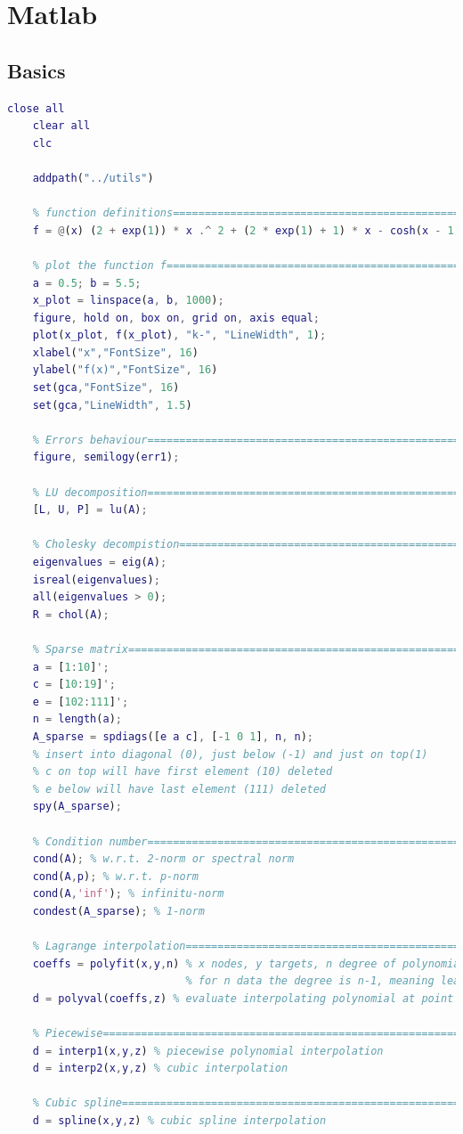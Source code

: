 
\section{Matlab}

\subsection{Basics}
    \begin{lstlisting}[language=Matlab, escapeinside=`', gobble=4]
    close all
    clear all
    clc

    addpath("../utils")

    % function definitions=========================================================
    f = @(x) (2 + exp(1)) * x .^ 2 + (2 * exp(1) + 1) * x - cosh(x - 1);

    % plot the function f==========================================================
    a = 0.5; b = 5.5;
    x_plot = linspace(a, b, 1000);
    figure, hold on, box on, grid on, axis equal;
    plot(x_plot, f(x_plot), "k-", "LineWidth", 1);
    xlabel("x","FontSize", 16)
    ylabel("f(x)","FontSize", 16)
    set(gca,"FontSize", 16)
    set(gca,"LineWidth", 1.5)

    % Errors behaviour=============================================================
    figure, semilogy(err1);

    % LU decomposition=============================================================
    [L, U, P] = lu(A);

    % Cholesky decompistion========================================================
    eigenvalues = eig(A);
    isreal(eigenvalues);
    all(eigenvalues > 0);
    R = chol(A);

    % Sparse matrix================================================================
    a = [1:10]';
    c = [10:19]';
    e = [102:111]';
    n = length(a);
    A_sparse = spdiags([e a c], [-1 0 1], n, n);
    % insert into diagonal (0), just below (-1) and just on top(1)
    % c on top will have first element (10) deleted
    % e below will have last element (111) deleted
    spy(A_sparse);

    % Condition number============================================================
    cond(A); % w.r.t. 2-norm or spectral norm
    cond(A,p); % w.r.t. p-norm
    cond(A,'inf'); % infinitu-norm
    condest(A_sparse); % 1-norm

    % Lagrange interpolation======================================================
    coeffs = polyfit(x,y,n) % x nodes, y targets, n degree of polynomial, but redundant
                            % for n data the degree is n-1, meaning least squares only
    d = polyval(coeffs,z) % evaluate interpolating polynomial at point z

    % Piecewise===================================================================
    d = interp1(x,y,z) % piecewise polynomial interpolation
    d = interp2(x,y,z) % cubic interpolation
    
    % Cubic spline================================================================
    d = spline(x,y,z) % cubic spline interpolation
    \end{lstlisting}

